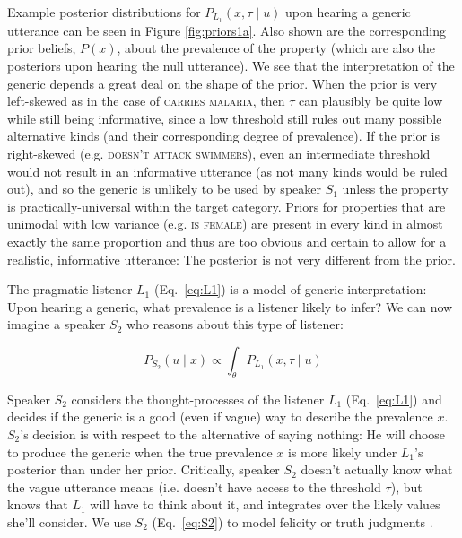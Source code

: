 \documentclass{pnastwo}
\begin{document}
\begin{article}
Example posterior distributions for $P_{L_{1}}(x , \tau \mid u)$ upon hearing a generic utterance can be seen in Figure \ref{fig:priors1a}. 
Also shown are the corresponding prior beliefs, $P(x)$, about the prevalence of the property (which are also the posteriors upon hearing the null utterance).
We see that the interpretation of the generic depends a great deal on the shape of the prior.
When the prior is very left-skewed as in the case of \textsc{carries malaria}, then $\tau$ can plausibly be quite low while still being informative, since a low threshold still rules out many possible alternative kinds (and their corresponding degree of prevalence).
If the prior is right-skewed (e.g. \textsc{doesn't attack swimmers}), even an intermediate threshold would not result in an informative utterance (as not many kinds would be ruled out), and so the generic is unlikely to be used by speaker $S_1$ unless the property is practically-universal within the target category. 
Priors for properties that are unimodal with low variance (e.g. \textsc{is female}) are present in every kind in almost exactly the same proportion and thus are too obvious and certain to allow for a realistic, informative utterance: The posterior is not very different from the prior. 

The pragmatic listener $L_1$ (Eq.~\ref{eq:L1}) is a model of generic interpretation: Upon hearing a generic, what prevalence is a listener likely to infer?
We can now imagine a speaker $S_2$ who reasons about this type of listener: 

\begin{equation} 
P_{S_{2}}(u \mid x) \propto  \int_{\theta} P_{L_{1}}(x , \tau \mid u) %
\label{eq:S2}
\end{equation}

Speaker $S_2$ considers the thought-processes of the listener $L_1$ (Eq.~\ref{eq:L1}) and decides if the generic is a good (even if vague) way to describe the prevalence $x$. 
$S_2$'s decision is with respect to the alternative of saying nothing: He will choose to produce the generic when the true prevalence $x$ is more likely under $L_1$'s posterior than under her prior. 
Critically, speaker $S_{2}$ doesn't actually know what the vague utterance means (i.e. doesn't have access to the threshold $\tau$), but knows that $L_{1}$ will have to think about it, and integrates over the likely values she'll consider.
We use $S_{2}$ (Eq.~\ref{eq:S2}) to model felicity or truth judgments \cite{Degen2014}.



\end{article}
\end{document}
